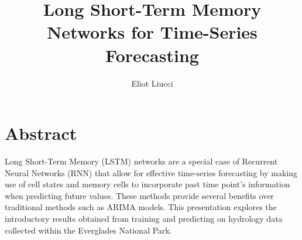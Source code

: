 \documentclass{article}
\title{Long Short-Term Memory Networks for Time-Series Forecasting}
\author{Eliot Liucci}
\begin{document}
\maketitle


\section*{Abstract}

Long Short-Term Memory (LSTM) networks are a special case of Recurrent Neural Networks (RNN) that allow for effective time-series forecasting by making use of cell states and memory cells to incorporate past time point's information when predicting future values. These methods provide several benefits over traditional methods such as ARIMA models. This presentation explores the introductory results obtained from training and predicting on hydrology data collected within the Everglades National Park.
\end{document}
